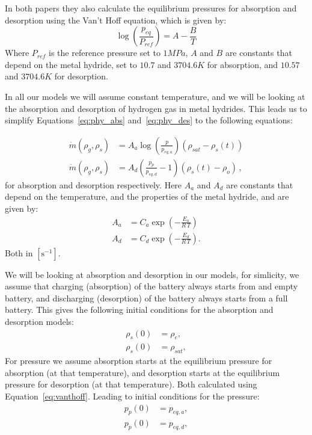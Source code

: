 In both papers they also calculate the equilibrium pressures for absorption and desorption using the Van't Hoff equation, which is given by:
\begin{equation}
\log\left(\frac{p_{eq}}{P_{ref}}\right) = A-\frac{B}{T}
\label{eq:vanthoff}
\end{equation}
Where $P_{ref}$ is the reference pressure set to $1MPa$, $A$ and $B$ are constants that depend on the metal hydride, set to $10.7$ and $3704.6K$ for absorption, and $10.57$ and $3704.6K$ for desorption.

In all our models we will assume constant temperature, and we will be looking at the absorption and desorption of hydrogen gas in metal hydrides. This leads us to simplify Equations~\ref{eq:phy_abs} and~\ref{eq:phy_des} to the following equations:

\begin{align}
    \label{eq:phy_dotm_abs}
    \dot m(\rho_g, \rho_s) &= A_a \log \left( \frac{p}{p_{eq,a}} \right)(\rho_{sat} - \rho_s(t)) \\
    \label{eq:phy_dotm_des}
    \dot m(\rho_g, \rho_s) &= A_d \left(\frac{p_p}{p_{eq,d}} - 1 \right)( \rho_s(t) - \rho_o) \, ,
\end{align}
for absorption and desorption respectively. Here $A_a$ and $A_d$ are constants that depend on the temperature, and the properties of the metal hydride, and are given by:
\begin{align}
    A_a &= C_a \exp(- \frac{E_a}{R \, T}) \\
    A_d &= C_d \exp(- \frac{E_d}{R \, T}).
\end{align}
Both in $[\mathrm{s^{-1}}]$.

We will be looking at absorption and desorption in our models, for simlicity, we assume that charging (absorption) of the battery always starts from and empty battery, and discharging (desorption) of the battery always starts from a full battery. This gives the following initial conditions for the absorption and desorption models:
\begin{align}
    \rho_s(0) &= \rho_{e}, \label{eq:phy_rhos_ini_abs}\\
    \rho_s(0) &= \rho_{sat}, \label{eq:phy_rhos_ini_des}
\end{align}
For pressure we assume absorption starts at the equilibrium pressure for absorption (at that temperature), and desorption starts at the equilibrium pressure for desorption (at that temperature). Both calculated using Equation~\ref{eq:vanthoff}. Leading to initial conditions for the pressure:
\begin{align}
    p_p(0) &= p_{eq,a}, \label{eq:phy_rhog_ini_abs}\\
    p_p(0) &= p_{eq,d}, \label{eq:phy_rhog_ini_des}
\end{align}


